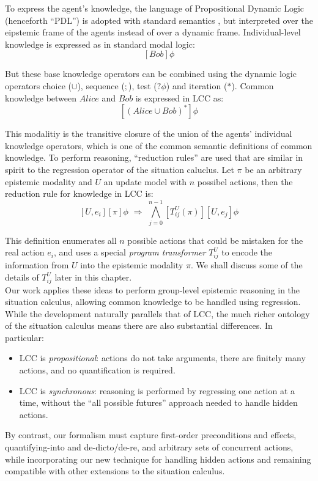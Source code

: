 To express the agent's knowledge, the language of Propositional Dynamic
Logic (henceforth {}``PDL'') is adopted with standard semantics
\citep{harel00dynamic_logic}, but interpreted over the eipstemic
frame of the agents instead of over a dynamic frame. Individual-level
knowledge is expressed as in standard modal logic:\[
[Bob]\phi\]


But these base knowledge operators can be combined using the dynamic
logic operators choice ($\cup$), sequence ($;$), test ($?\phi$)
and iteration ($*$). Common knowledge between $Alice$ and $Bob$
is expressed in LCC as:\[
[(Alice\cup Bob)^{*}]\phi\]


This modalitiy is the transitive closure of the union of the agents'
individual knowledge operators, which is one of the common semantic
definitions of common knowledge. To perform reasoning, {}``reduction
rules'' are used that are similar in spirit to the regression operator
of the situation caluclus. Let $\pi$ be an arbitrary epistemic modality
and $U$ an update model with $n$ possibel actions, then the reduction
rule for knowledge in LCC is:\[
[U,e_{i}][\pi]\phi\,\,\Rightarrow\,\,\bigwedge_{j=0}^{n-1}[T_{ij}^{U}(\pi)][U,e_{j}]\phi\]


This definition enumerates all $n$ possible actions that could be
mistaken for the real action $e_{i}$, and uses a special \emph{program
transformer} $T_{ij}^{U}$ to encode the information from $U$ into
the epistemic modality $\pi$. We shall discuss some of the details
of $T_{ij}^{U}$ later in this chapter. \\


Our work applies these ideas to perform group-level epistemic reasoning
in the situation calculus, allowing common knowledge to be handled
using regression. While the development naturally parallels that of
LCC, the much richer ontology of the situation calculus means there
are also substantial differences. In particular:

\begin{itemize}
\item LCC is \emph{propositional}: actions do not take arguments, there
are finitely many actions, and no quantification is required. 
\item LCC is \emph{synchronous}: reasoning is performed by regressing one
action at a time, without the {}``all possible futures'' approach
needed to handle hidden actions. 
\end{itemize}
By contrast, our formalism must capture first-order preconditions
and effects, quant\-ifying-into and de-dicto/de-re, and arbitrary
sets of concurrent actions, while incorporating our new technique
for handling hidden actions and remaining compatible with other extensions
to the situation calculus.

